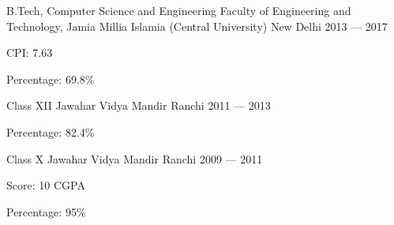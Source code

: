 
\begin{cventries}

  \cventry%
    {B.Tech, Computer Science and Engineering} %
    {Faculty of Engineering and Technology, Jamia Millia Islamia (Central University)} %
    {New Delhi} %
    {2013 --- 2017} %
    {%
      \begin{cvitems}%
        \item{CPI: 7.63}
        \item{Percentage: 69.8\%}
      \end{cvitems}
    }

  \cventry%
    {Class XII} %
    {Jawahar Vidya Mandir} %
    {Ranchi} %
    {2011 --- 2013} %
    {%
      \begin{cvitems} %
        \item{Percentage: 82.4\%}
      \end{cvitems}
    }

  \cventry%
    {Class X} %
    {Jawahar Vidya Mandir} %
    {Ranchi} %
    {2009 --- 2011} %
    {%
      \begin{cvitems} %
        \item{Score: 10 CGPA}
        \item{Percentage: 95\%}
      \end{cvitems}
    }

\end{cventries}

